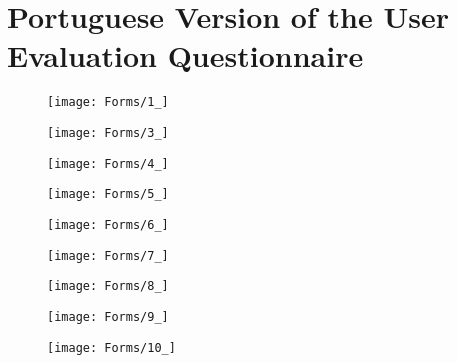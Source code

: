 
%

\chapter{Portuguese Version of the User Evaluation Questionnaire}
\label{app:questionnaire}

\begin{figure}
    \centering
    \texttt{[image: Forms/1\_]}
\end{figure}

\begin{figure}
    \centering
    \texttt{[image: Forms/3\_]}
\end{figure}

\begin{figure}
    \centering
    \texttt{[image: Forms/4\_]}
\end{figure}

\begin{figure}
    \centering
    \texttt{[image: Forms/5\_]}
\end{figure}

\begin{figure}
    \centering
    \texttt{[image: Forms/6\_]}
\end{figure}

\begin{figure}
    \centering
    \texttt{[image: Forms/7\_]}
\end{figure}

\begin{figure}
    \centering
    \texttt{[image: Forms/8\_]}
\end{figure}

\begin{figure}
    \centering
    \texttt{[image: Forms/9\_]}
\end{figure}


\begin{figure}[h!]
    \centering
    \texttt{[image: Forms/10\_]}
\end{figure}

